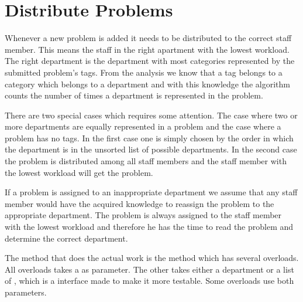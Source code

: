 \section{Distribute Problems}
\label{sec:dispro}
Whenever a new problem is added it needs to be distributed to the correct staff member.
This means the staff in the right apartment with the lowest workload. 
The right department is the department with most categories represented by the submitted problem's tags.
From the analysis we know that a tag belongs to a category which belongs to a department and with this knowledge the algorithm counts the number of times a department is represented in the problem.

There are two special cases which requires some attention. 
The case where two or more departments are equally represented in a problem and the case where a problem has no tags. 
In the first case one is simply chosen by the order in which the department is in the unsorted list of possible departments. 
In the second case the problem is distributed among all staff members and the staff member with the lowest workload will get the problem. 

If a problem is assigned to an inappropriate department we assume that any staff member would have the acquired knowledge to reassign the problem to the appropriate department. 
The problem is always assigned to the staff member with the lowest workload and therefore he has the time to read the problem and determine the correct department.

The method that does the actual work is the  method which has several overloads. 
All overloads takes a  as parameter. 
The other takes either a department or a list of , which is a  interface made to make it more testable. 
Some overloads use both parameters.